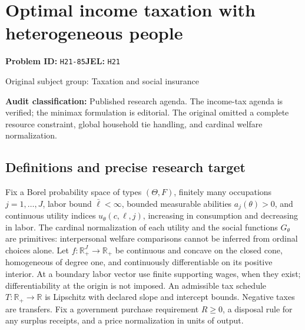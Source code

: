 \documentclass[11pt,a4paper]{article}
\begin{document}
\section*{Optimal income taxation with heterogeneous people}
\textbf{Problem ID:} \texttt{H21-85}\quad \textbf{JEL:} \texttt{H21}\par
\label{problem:OP-0470}
{\sffamily\small\color{muted}Original subject group: Taxation and social insurance\par}
\label{definitions:problem:30007752}
\textbf{Audit classification:} Published research agenda. The income-tax agenda is verified; the minimax formulation is editorial. The original omitted a complete resource constraint, global household tie handling, and cardinal welfare normalization.
\subsection*{Definitions and precise research target}
Fix a Borel probability space of types \((\Theta,F)\), finitely many occupations \(j=1,\ldots,J\), labor bound \(\bar\ell<\infty\), bounded measurable abilities \(a_j(\theta)>0\), and continuous utility indices \(u_\theta(c,\ell,j)\), increasing in consumption and decreasing in labor. The cardinal normalization of each utility and the social functions \(G_\theta\) are primitives: interpersonal welfare comparisons cannot be inferred from ordinal choices alone. Let \(f:\mathbb R_+^J\to\mathbb R_+\) be continuous and concave on the closed cone, homogeneous of degree one, and continuously differentiable on its positive interior. At a boundary labor vector use finite supporting wages, when they exist; differentiability at the origin is not imposed. An admissible tax schedule \(T:\mathbb R_+\to\mathbb R\) is Lipschitz with declared slope and intercept bounds. Negative taxes are transfers. Fix a government purchase requirement \(R\geq0\), a disposal rule for any surplus receipts, and a price normalization in units of output.
\end{document}
